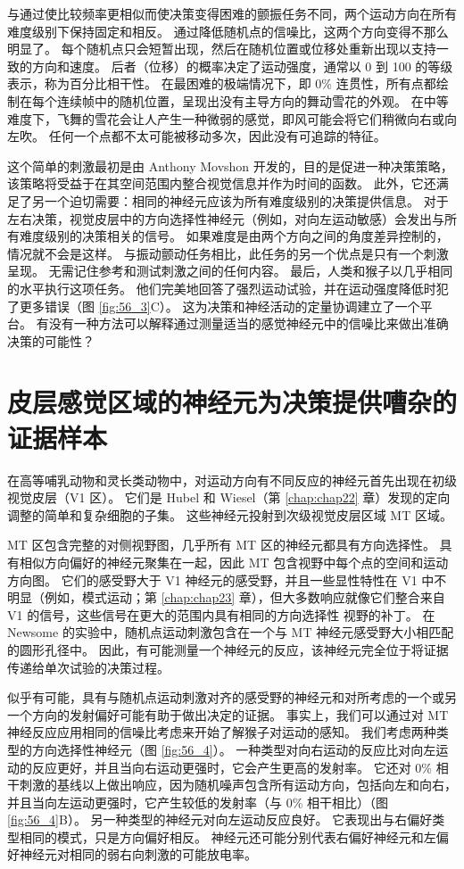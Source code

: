 与通过使比较频率更相似而使决策变得困难的颤振任务不同，两个运动方向在所有难度级别下保持固定和相反。 通过降低随机点的信噪比，这两个方向变得不那么明显了。 每个随机点只会短暂出现，然后在随机位置或位移处重新出现以支持一致的方向和速度。 后者（位移）的概率决定了运动强度，通常以 0 到 100 的等级表示，称为百分比相干性。 在最困难的极端情况下，即 0\% 连贯性，所有点都绘制在每个连续帧中的随机位置，呈现出没有主导方向的舞动雪花的外观。 在中等难度下，飞舞的雪花会让人产生一种微弱的感觉，即风可能会将它们稍微向右或向左吹。 任何一个点都不太可能被移动多次，因此没有可追踪的特征。

这个简单的刺激最初是由 Anthony Movshon 开发的，目的是促进一种决策策略，该策略将受益于在其空间范围内整合视觉信息并作为时间的函数。 此外，它还满足了另一个迫切需要：相同的神经元应该为所有难度级别的决策提供信息。 对于左右决策，视觉皮层中的方向选择性神经元（例如，对向左运动敏感）会发出与所有难度级别的决策相关的信号。 如果难度是由两个方向之间的角度差异控制的，情况就不会是这样。 与振动颤动任务相比，此任务的另一个优点是只有一个刺激呈现。 无需记住参考和测试刺激之间的任何内容。 最后，人类和猴子以几乎相同的水平执行这项任务。 他们完美地回答了强烈运动试验，并在运动强度降低时犯了更多错误（图 \ref{fig:56_3}C）。 这为决策和神经活动的定量协调建立了一个平台。 有没有一种方法可以解释通过测量适当的感觉神经元中的信噪比来做出准确决策的可能性？

\section{皮层感觉区域的神经元为决策提供嘈杂的证据样本}

在高等哺乳动物和灵长类动物中，对运动方向有不同反应的神经元首先出现在初级视觉皮层（V1 区）。 它们是 Hubel 和 Wiesel（第 \ref{chap:chap22} 章）发现的定向调整的简单和复杂细胞的子集。 这些神经元投射到次级视觉皮层区域 MT 区域。

MT 区包含完整的对侧视野图，几乎所有 MT 区的神经元都具有方向选择性。 具有相似方向偏好的神经元聚集在一起，因此 MT 包含视野中每个点的空间和运动方向图。 它们的感受野大于 V1 神经元的感受野，并且一些显性特性在 V1 中不明显（例如，模式运动；第 \ref{chap:chap23} 章），但大多数响应就像它们整合来自 V1 的信号，这些信号在更大的范围内具有相同的方向选择性 视野的补丁。 在 Newsome 的实验中，随机点运动刺激包含在一个与 MT 神经元感受野大小相匹配的圆形孔径中。 因此，有可能测量一个神经元的反应，该神经元完全位于将证据传递给单次试验的决策过程。

似乎有可能，具有与随机点运动刺激对齐的感受野的神经元和对所考虑的一个或另一个方向的发射偏好可能有助于做出决定的证据。 事实上，我们可以通过对 MT 神经反应应用相同的信噪比考虑来开始了解猴子对运动的感知。 我们考虑两种类型的方向选择性神经元（图 \ref{fig:56_4}）。 一种类型对向右运动的反应比对向左运动的反应更好，并且当向右运动更强时，它会产生更高的发射率。 它还对 0\% 相干刺激的基线以上做出响应，因为随机噪声包含所有运动方向，包括向左和向右，并且当向左运动更强时，它产生较低的发射率（与 0\% 相干相比）（图 \ref{fig:56_4}B）。 另一种类型的神经元对向左运动反应良好。 它表现出与右偏好类型相同的模式，只是方向偏好相反。 神经元还可能分别代表右偏好神经元和左偏好神经元对相同的弱右向刺激的可能放电率。


